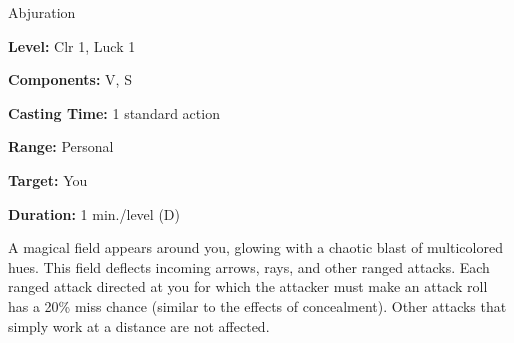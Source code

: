 
Abjuration

\textbf{Level:} Clr 1, Luck 1

\textbf{Components:} V, S

\textbf{Casting Time:} 1 standard action

\textbf{Range:} Personal

\textbf{Target:} You

\textbf{Duration:} 1 min./level (D)

A magical field appears around you, glowing with a chaotic blast of multicolored 
hues. This field deflects incoming arrows, rays, and other ranged attacks. Each 
ranged attack directed at you for which the attacker must make an attack roll has 
a 20\% miss chance (similar to the effects of concealment). Other attacks that 
simply work at a distance are not affected.

